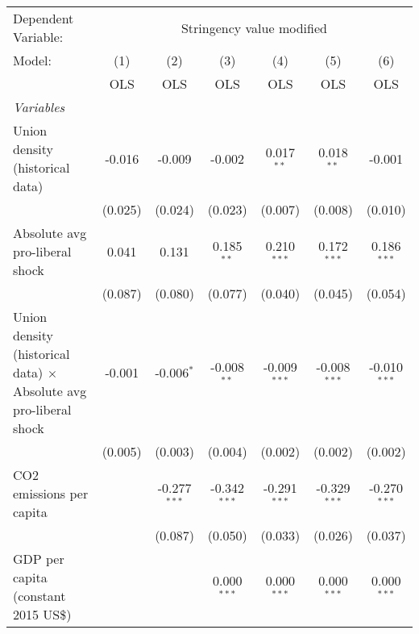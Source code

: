 
\begingroup
\centering
\begin{tabular}{lcccccc}
   \toprule
   Dependent Variable: & \multicolumn{6}{c}{Stringency value modified}\\
   Model:                                                                   & (1)     & (2)            & (3)            & (4)            & (5)            & (6)\\  
                                                                            &  OLS    & OLS            & OLS            & OLS            & OLS            & OLS\\  
   \midrule
   \emph{Variables}\\
   Union density (historical data)                                          & -0.016  & -0.009         & -0.002         & 0.017$^{**}$   & 0.018$^{**}$   & -0.001\\   
                                                                            & (0.025) & (0.024)        & (0.023)        & (0.007)        & (0.008)        & (0.010)\\   
   Absolute avg pro-liberal shock                                           & 0.041   & 0.131          & 0.185$^{**}$   & 0.210$^{***}$  & 0.172$^{***}$  & 0.186$^{***}$\\   
                                                                            & (0.087) & (0.080)        & (0.077)        & (0.040)        & (0.045)        & (0.054)\\   
   Union density (historical data) $\times$ Absolute avg pro-liberal shock  & -0.001  & -0.006$^{*}$   & -0.008$^{**}$  & -0.009$^{***}$ & -0.008$^{***}$ & -0.010$^{***}$\\   
                                                                            & (0.005) & (0.003)        & (0.004)        & (0.002)        & (0.002)        & (0.002)\\   
   CO2 emissions per capita                                                 &         & -0.277$^{***}$ & -0.342$^{***}$ & -0.291$^{***}$ & -0.329$^{***}$ & -0.270$^{***}$\\   
                                                                            &         & (0.087)        & (0.050)        & (0.033)        & (0.026)        & (0.037)\\   
   GDP per capita (constant 2015 US\$)                                      &         &                & 0.000$^{***}$  & 0.000$^{***}$  & 0.000$^{***}$  & 0.000$^{***}$\\   

\end{tabular}
